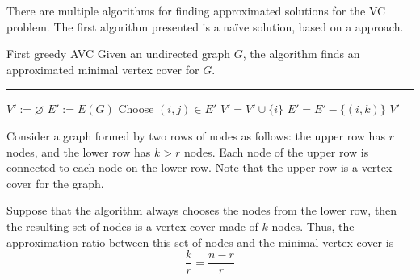 \documentclass[a4paper, 12pt]{report}
\begin{document}
    There are multiple algorithms for finding approximated solutions for the VC problem. The first algorithm presented is a naïve solution, based on a  approach.

    \begin{framedalgo}[label={alg:first_greedy_avc}]{First greedy AVC}
        Given an undirected graph $G$, the algorithm finds an approximated minimal vertex cover for $G$. \\
        \hrule

        \quad
        \begin{algorithmic}[1]
                \State $V' := \varnothing$
                \State $E' := E(G)$
                    \State Choose $(i, j) \in E'$
                    \State $V' = V' \cup \{i\}$
                     
                        \State $E' = E' - \{(i, k)\}$
                    \EndFor
                \EndWhile
                \State {} $V'$
            \EndFunction
        \end{algorithmic}
    \end{framedalgo}



    Consider a graph formed by two rows of nodes as follows: the upper row has $r$ nodes, and the lower row has $k > r$ nodes. Each node of the upper row is connected to each node on the lower row. Note that the upper row is a  vertex cover for the graph.

    Suppose that the algorithm always chooses the nodes from the lower row, then the resulting set of nodes is a vertex cover made of $k$ nodes. Thus, the approximation ratio between this set of nodes and the minimal vertex cover is $$\dfrac{k}{r} = \dfrac{n - r}{r}$$
   
\end{document}
